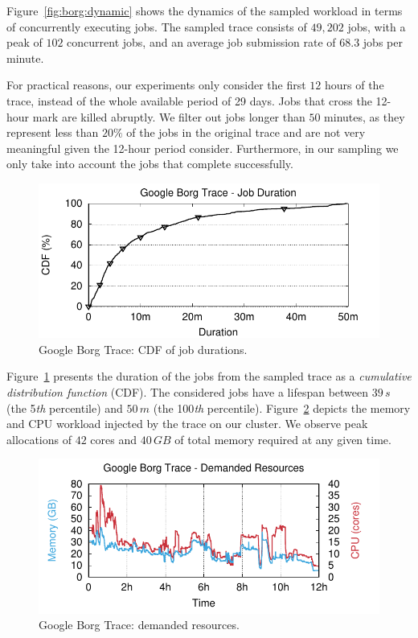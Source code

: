 Figure~\ref{fig:borg:dynamic} shows the dynamics of the sampled workload in terms of concurrently executing jobs.
The sampled trace consists of $49,202$ jobs, with a peak of $102$ concurrent jobs, and an average job submission rate of $68.3$ jobs per minute.

For practical reasons, our experiments only consider the first $12$ hours of the trace, instead of the whole available period of 29 days.
Jobs that cross the 12-hour mark are killed abruptly.
We filter out jobs longer than $50$ minutes, as they represent less than $20\%$ of the jobs in the original trace and are not very meaningful given the 12-hour period consider.
Furthermore, in our sampling we only take into account the jobs that complete successfully.

\begin{figure}[t!]
  \centering
  \includegraphics[]{Figures/plots/borg/jobs_duration}
  \caption{Google Borg Trace: CDF of job durations.}
  \label{fig:borg:duration}
\end{figure}

Figure~\ref{fig:borg:duration} presents the duration of the jobs from the sampled trace as a \emph{cumulative distribution function} (CDF).
The considered jobs have a lifespan between $39\,s$ (the 5\emph{th} percentile) and $50\,m$ (the 100\emph{th} percentile).
Figure~\ref{fig:borg:resources} depicts the memory and CPU workload injected by the trace on our cluster.
We observe peak allocations of $42$ cores and $40\,GB$ of total memory required at any given time.

\begin{figure}[t!]
  \centering
  \includegraphics[]{Figures/plots/borg/trace_resources}
  \caption{Google Borg Trace: demanded resources.}
  \label{fig:borg:resources}
\end{figure}

